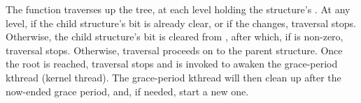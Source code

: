 %
%
%
%

The  function traverses up the  tree,
at each level holding the  structure's .
At any level, if the child structure's  bit is already clear,
or if the  changes, traversal stops.
Otherwise, the child structure's bit is cleared from ,
after which, if  is non-zero, %
traversal stops. Otherwise, traversal proceeds on to the parent  structure.
Once the root is reached, traversal stops and  is
invoked to awaken the grace-period kthread (kernel thread).
The grace-period kthread will then clean up after the now-ended grace
period, and, if needed, start a new one.


